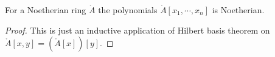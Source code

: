 \begin{corollary} \label{cor:polynomials-in-multiple-variables-noetherian}
  For a Noetherian ring $\ring{A}$ the polynomials
  $\ring{A}[x_1,\cdots,x_n]$ is Noetherian.
\end{corollary}

\begin{proof}
  This is just an inductive application of Hilbert basis theorem on
  $\ring{A}[x,y]= (\ring{A}[x])[y]$.
\end{proof}





